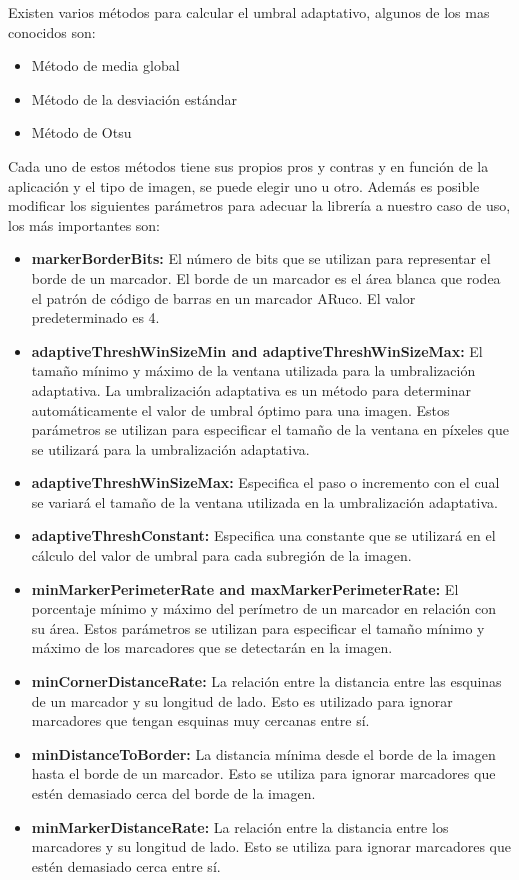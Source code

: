 Existen varios métodos para calcular el umbral adaptativo, algunos de los mas conocidos son:
\begin{itemize}
\item Método de media global
\item Método de la desviación estándar
\item Método de Otsu
\end{itemize}
Cada uno de estos métodos tiene sus propios pros y contras y en función de la aplicación y el tipo de imagen, se puede elegir uno u otro.
Además es posible modificar los siguientes parámetros para adecuar la librería a nuestro caso de uso, los más importantes son:
\begin{itemize}
    \item   \textbf{markerBorderBits:}
    El número de bits que se utilizan para representar el borde de un marcador. El borde de un marcador es el área blanca que rodea el patrón de código de barras en un marcador ARuco. El valor predeterminado es 4.
    \item \textbf{adaptiveThreshWinSizeMin and adaptiveThreshWinSizeMax:}
    El tamaño mínimo y máximo de la ventana utilizada para la umbralización adaptativa. La umbralización adaptativa es un método para determinar automáticamente el valor de umbral óptimo para una imagen. Estos parámetros se utilizan para especificar el tamaño de la ventana en píxeles que se utilizará para la umbralización adaptativa.
    \item \textbf{adaptiveThreshWinSizeMax:}
    Especifica el paso o incremento con el cual se variará el tamaño de la ventana utilizada en la umbralización adaptativa.
    \item \textbf{adaptiveThreshConstant:}
    Especifica una constante que se utilizará en el cálculo del valor de umbral para cada subregión de la imagen.
    \item \textbf{minMarkerPerimeterRate and maxMarkerPerimeterRate:}
    El porcentaje mínimo y máximo del perímetro de un marcador en relación con su área. Estos parámetros se utilizan para especificar el tamaño mínimo y máximo de los marcadores que se detectarán en la imagen.
    \item \textbf{minCornerDistanceRate:}
    La relación entre la distancia entre las esquinas de un marcador y su longitud de lado. Esto es utilizado para ignorar marcadores que tengan esquinas muy cercanas entre sí.
    \item \textbf{minDistanceToBorder:}
    La distancia mínima desde el borde de la imagen hasta el borde de un marcador. Esto se utiliza para ignorar marcadores que estén demasiado cerca del borde de la imagen.
    \item \textbf{ minMarkerDistanceRate:}
    La relación entre la distancia entre los marcadores y su longitud de lado. Esto se utiliza para ignorar marcadores que estén demasiado cerca entre sí.
\end{itemize}

